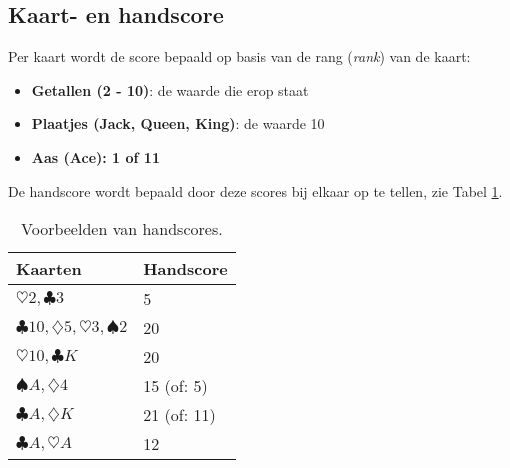 

\subsection*{Kaart- en handscore}
Per kaart wordt de score bepaald op basis van de rang (\textit{rank}) van de kaart:

\begin{itemize}
    \item \textbf{Getallen (2 - 10)}: de waarde die erop staat
    \item \textbf{Plaatjes (Jack, Queen, King)}: de waarde 10
    \item \textbf{Aas (Ace): 1 of 11}
\end{itemize}

De handscore wordt bepaald door deze scores bij elkaar op te tellen, 
zie Tabel \ref{table:handscores}.

\begin{table}[H]
    \centering
    \begin{tabularx}{0.4\textwidth}{|l|X|}
        \hline
        \textbf{Kaarten} & \textbf{Handscore} \\ \hline
        $\heartsuit 2, \clubsuit 3$ & 5 \\ \hline
        $\clubsuit 10, \diamondsuit 5, \heartsuit 3, \spadesuit2$ & 20 \\ \hline
        $\heartsuit 10, \clubsuit K$  & 20                 \\ \hline
        $\spadesuit A, \diamondsuit 4$ & 15 (of: 5)         \\ \hline
        $\clubsuit A, \diamondsuit K$ & 21 (of: 11)         \\ \hline
        $\clubsuit A, \heartsuit A$ & 12                 \\ \hline
    \end{tabularx}
    \caption{Voorbeelden van handscores.}
    \label{table:handscores}
    \centering
\end{table}

